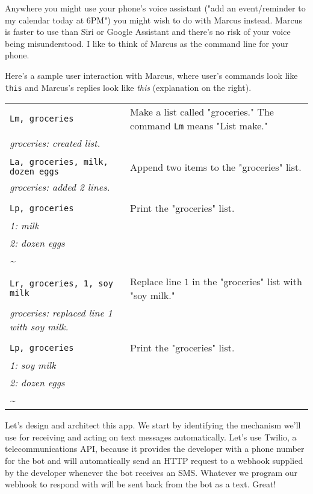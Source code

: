 \documentclass{article}
\newcommand{\user}[1]{\texttt{#1}}
\newcommand{\marcus}[1]{\textit{#1}}
\begin{document}
Anywhere you might use your phone's voice assistant ("add an event/reminder to my calendar today at 6PM") you might wish to do with Marcus instead.
Marcus is faster to use than Siri or Google Assistant and there's no risk of your voice being misunderstood.
I like to think of Marcus as the command line for your phone.

Here's a sample user interaction with Marcus, where user's commands look like \user{this} and Marcus's replies look like \marcus{this} (explanation on the right).

\begin{tabular}{ l | l }
  \user{Lm, groceries} & Make a list called "groceries." The command \user{Lm} means "List make." \\
  \marcus{groceries: created list.} & \\

  \\

  \user{La, groceries, milk, dozen eggs} & Append two items to the "groceries" list. \\
  \marcus{groceries: added 2 lines.} & \\

  \\

  \user{Lp, groceries} & Print the "groceries" list. \\
  \marcus{1: milk} & \\
  \marcus{2: dozen eggs} & \\
  \marcus{\textasciitilde} & \\

  \\

  \user{Lr, groceries, 1, soy milk} & Replace line $1$ in the "groceries" list with "soy milk." \\
  \marcus{groceries: replaced line 1 with soy milk.} & \\

  \\

  \user{Lp, groceries} & Print the "groceries" list. \\
  \marcus{1: soy milk} & \\
  \marcus{2: dozen eggs} & \\
  \marcus{\textasciitilde} & \\
\end{tabular}

Let's design and architect this app.
We start by identifying the mechanism we'll use for receiving and acting on text messages automatically.
Let's use Twilio, a telecommunications API, because it provides the developer with a phone number for the bot and will automatically send an HTTP request to a webhook supplied by the developer whenever the bot receives an SMS.
Whatever we program our webhook to respond with will be sent back from the bot as a text.
Great!
\end{document}
